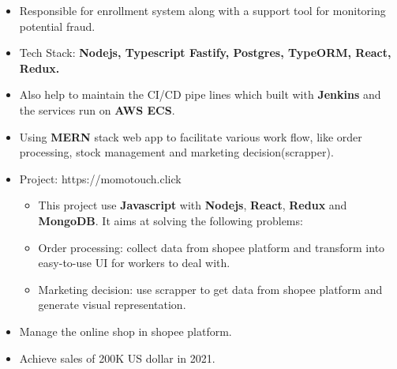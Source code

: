 \documentclass[10pt,a4paper,ragged2e,withhyper]{altacv}
\begin{document}
\begin{paracol}{2}
            \begin{itemize}
                \item Responsible for enrollment system along with a support tool for monitoring potential fraud.
                \item Tech Stack: \textbf{Nodejs, Typescript Fastify, Postgres, TypeORM, React, Redux.}
                \item Also help to maintain the CI/CD pipe lines which built with \textbf{Jenkins} and the services run on \textbf{AWS ECS}.
            \end{itemize}
            \begin{itemize}
                \item Using \textbf{MERN} stack web app to facilitate various work flow, like order processing, stock management and marketing decision(scrapper).
                \item Project: https://momotouch.click
                \begin{itemize}
                    \item This project use \textbf{Javascript} with \textbf{Nodejs}, \textbf{React}, \textbf{Redux} and \textbf{MongoDB}. It aims at solving the following problems:
                    \item {} Order processing: collect data from shopee platform and transform into easy-to-use UI for workers to deal with.
                    \item {} Marketing decision: use scrapper to get data from shopee platform and generate visual representation.
                \end{itemize}
            \end{itemize}
            \divider
            
            \begin{itemize}
                \item Manage the online shop in shopee platform.
                \item Achieve sales of 200K US dollar in 2021.
            \end{itemize}
            \divider
        

\end{paracol}
\end{document}
